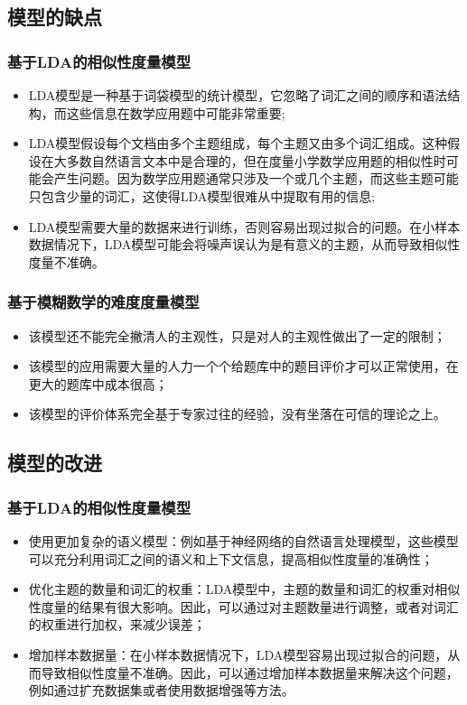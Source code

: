 \subsection{模型的缺点}

\subsubsection{基于LDA的相似性度量模型}

\begin{itemize}
    \item LDA模型是一种基于词袋模型的统计模型，它忽略了词汇之间的顺序和语法结构，而这些信息在数学应用题中可能非常重要;
    \item LDA模型假设每个文档由多个主题组成，每个主题又由多个词汇组成。这种假设在大多数自然语言文本中是合理的，但在度量小学数学应用题的相似性时可能会产生问题。因为数学应用题通常只涉及一个或几个主题，而这些主题可能只包含少量的词汇，这使得LDA模型很难从中提取有用的信息;
    \item LDA模型需要大量的数据来进行训练，否则容易出现过拟合的问题。在小样本数据情况下，LDA模型可能会将噪声误认为是有意义的主题，从而导致相似性度量不准确。
\end{itemize}

\subsubsection{基于模糊数学的难度度量模型}

\begin{itemize}
    \item 该模型还不能完全撇清人的主观性，只是对人的主观性做出了一定的限制；
    \item 该模型的应用需要大量的人力一个个给题库中的题目评价才可以正常使用，在更大的题库中成本很高；
    \item 该模型的评价体系完全基于专家过往的经验，没有坐落在可信的理论之上。
\end{itemize}

\subsection{模型的改进}

\subsubsection{基于LDA的相似性度量模型}

\begin{itemize}
    \item 使用更加复杂的语义模型：例如基于神经网络的自然语言处理模型，这些模型可以充分利用词汇之间的语义和上下文信息，提高相似性度量的准确性；
    \item 优化主题的数量和词汇的权重：LDA模型中，主题的数量和词汇的权重对相似性度量的结果有很大影响。因此，可以通过对主题数量进行调整，或者对词汇的权重进行加权，来减少误差；
    \item 增加样本数据量：在小样本数据情况下，LDA模型容易出现过拟合的问题，从而导致相似性度量不准确。因此，可以通过增加样本数据量来解决这个问题，例如通过扩充数据集或者使用数据增强等方法。
\end{itemize}

